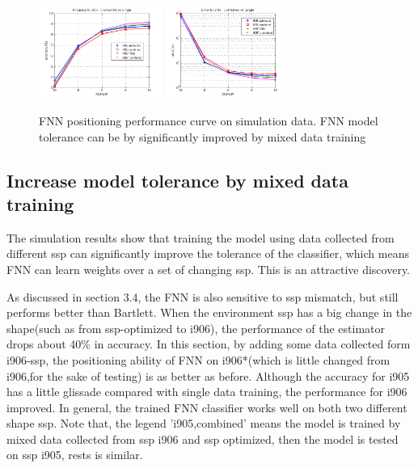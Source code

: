 \begin{figure}
\includegraphics[width=4cm,height=3cm]{figure/Accuracy_to_SNR_Combined_vs_Single}
\includegraphics[width=4cm,height=3cm]{figure/Error_to_SNR_Combined_vs_Single}
\caption{FNN positioning performance curve on simulation data. FNN model tolerance can be by significantly improved by mixed data training}
\end{figure}

\subsection{%
Increase model tolerance by mixed data training}
The simulation results show that training the model using data collected from different ssp can significantly improve the tolerance of the classifier, which means FNN can learn weights over a set of changing ssp. This is an attractive discovery.


As discussed in section 3.4, the FNN is also sensitive to ssp mismatch, but still performs better than Bartlett. When the environment ssp has a big change in the shape(such as from ssp-optimized to i906), the performance of the estimator drops about 40\% in accuracy. In this section, by adding some data collected form i906-ssp, the positioning ability of FNN on i906{*}(which is little changed from i906,for the sake of testing) is as better as before. Although the accuracy for i905 has a little glissade compared with single data training, the performance for i906 improved. In general, the trained FNN classifier works well on both two different shape ssp. Note that, the legend 'i905,combined' means the model is trained by mixed data collected from ssp i906 and ssp optimized, then the model is tested on ssp i905, rests is similar.

